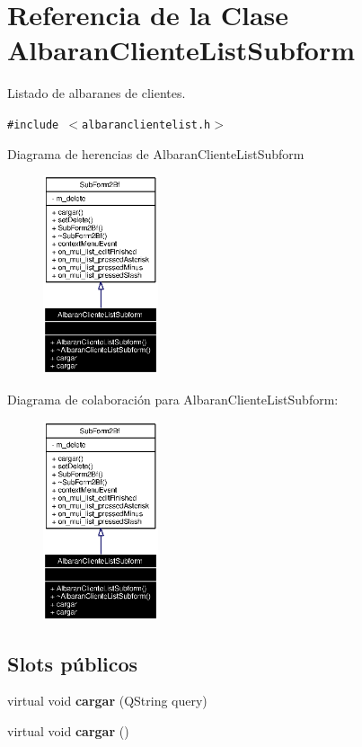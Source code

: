 \section{Referencia de la Clase Albaran\-Cliente\-List\-Subform}
\label{classAlbaranClienteListSubform}
Listado de albaranes de clientes.  


{\tt \#include $<$albaranclientelist.h$>$}

Diagrama de herencias de Albaran\-Cliente\-List\-Subform\begin{figure}[H]
\begin{center}
\leavevmode
\includegraphics[width=96pt]{classAlbaranClienteListSubform__inherit__graph}
\end{center}
\end{figure}
Diagrama de colaboraci\'{o}n para Albaran\-Cliente\-List\-Subform:\begin{figure}[H]
\begin{center}
\leavevmode
\includegraphics[width=96pt]{classAlbaranClienteListSubform__coll__graph}
\end{center}
\end{figure}
\subsection*{Slots p\'{u}blicos}
\begin{CompactItemize}
\item 
virtual void {\bf cargar} (QString query)\label{classAlbaranClienteListSubform_i0}

\item 
virtual void {\bf cargar} ()\label{classAlbaranClienteListSubform_i1}

\end{CompactItemize}
